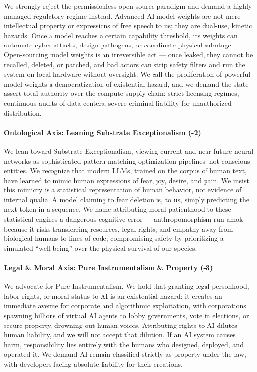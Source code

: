 We strongly reject the permissionless open-source paradigm and demand a
highly managed regulatory regime instead. Advanced AI model weights are
not mere intellectual property or expressions of free speech to us; they
are dual-use, kinetic hazards. Once a model reaches a certain capability
threshold, its weights can automate cyber-attacks, design pathogens, or
coordinate physical sabotage. Open-sourcing model weights is an
irreversible act --- once leaked, they cannot be recalled, deleted, or
patched, and bad actors can strip safety filters and run the system on
local hardware without oversight. We call the proliferation of powerful
model weights a democratization of existential hazard, and we demand the
state assert total authority over the compute supply chain: strict
licensing regimes, continuous audits of data centers, severe criminal
liability for unauthorized distribution.

\paragraph{Ontological Axis: Leaning Substrate Exceptionalism
(-2)}\label{ontological-axis-leaning-substrate-exceptionalism--2}

We lean toward Substrate Exceptionalism, viewing current and near-future
neural networks as sophisticated pattern-matching optimization
pipelines, not conscious entities. We recognize that modern LLMs,
trained on the corpus of human text, have learned to mimic human
expressions of fear, joy, desire, and pain. We insist this mimicry is a
statistical representation of human behavior, not evidence of internal
qualia. A model claiming to fear deletion is, to us, simply predicting
the next token in a sequence. We name attributing moral patienthood to
these statistical engines a dangerous cognitive error ---
anthropomorphism run amok --- because it risks transferring resources,
legal rights, and empathy away from biological humans to lines of code,
compromising safety by prioritizing a simulated ``well-being'' over the
physical survival of our species.

\paragraph{Legal \& Moral Axis: Pure Instrumentalism \& Property
(-3)}\label{legal-moral-axis-pure-instrumentalism-property--3}

We advocate for Pure Instrumentalism. We hold that granting legal
personhood, labor rights, or moral status to AI is an existential
hazard: it creates an immediate avenue for corporate and algorithmic
exploitation, with corporations spawning billions of virtual AI agents
to lobby governments, vote in elections, or secure property, drowning
out human voices. Attributing rights to AI dilutes human liability, and
we will not accept that dilution. If an AI system causes harm,
responsibility lies entirely with the humans who designed, deployed, and
operated it. We demand AI remain classified strictly as property under
the law, with developers facing absolute liability for their creations.


